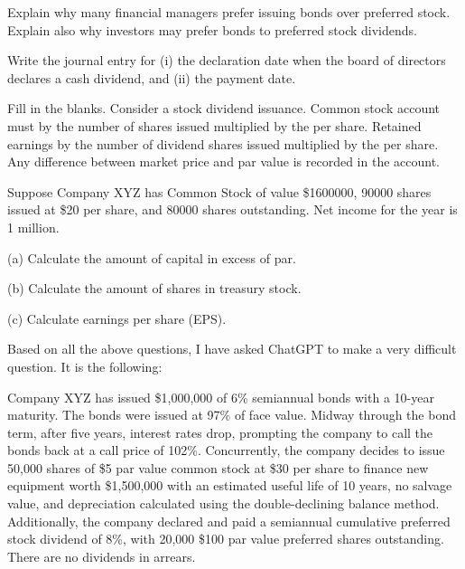 \documentclass{scrartcl}
\begin{document}
\vspace{5em}

Explain why many financial managers prefer issuing bonds over preferred
stock. Explain also why investors may prefer bonds to preferred stock
dividends.

\vspace{10em}

Write the journal entry for (i) the declaration date when the board of
directors declares a cash dividend, and (ii) the payment date.

\vspace{10em}

Fill in the blanks. Consider a stock dividend issuance. Common stock
account must \underline{\phantom{increase}} by the number of shares
issued multiplied by the \underline{\phantom{par value}} per share.
Retained earnings \underline{\phantom{decreases}} by the number of 
dividend shares issued multiplied by the \underline{\phantom{market 
value}} per share. Any difference between market price and par value
is recorded in the \underline{\phantom{Additional Paid-In Capital}} 
account. 

\vspace{5em}

Suppose Company XYZ has Common Stock of value \$1600000, 90000 shares
issued at \$20 per share, and 80000 shares outstanding. Net income for
the year is 1 million.

(a) Calculate the amount of capital in excess of par.

\vspace{5em}

(b) Calculate the amount of shares in treasury stock.

\vspace{5em}

(c) Calculate earnings per share (EPS). 

\vspace{10em}

Based on all the above questions, I have 
asked ChatGPT to make a very difficult question. It is the following:

Company XYZ has issued \$1,000,000 of 6\% semiannual bonds with a 
10-year maturity. The bonds were issued at 97\% of face value.
Midway through the bond term, after five years, interest rates drop,
prompting the company to call the bonds back at a call price of 102\%.
Concurrently, the company decides to issue 50,000 shares of \$5 par 
value common stock at \$30 per share to finance new equipment worth
\$1,500,000 with an estimated useful life of 10 years, no salvage value,
and depreciation calculated using the double-declining balance method. 
Additionally, the company declared and paid a semiannual cumulative 
preferred stock dividend of 8\%, with 20,000 \$100 par value preferred
shares outstanding. There are no dividends in arrears.
\end{document}
